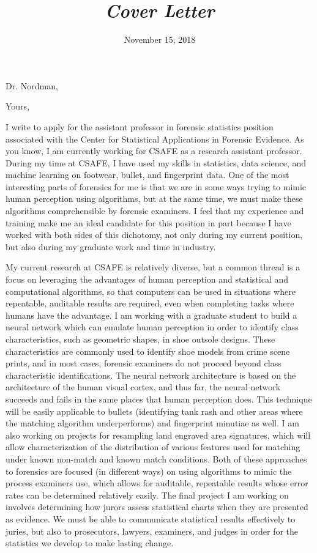 \documentclass[12pt, letterpaper, sans]{moderncv}
\title{\emph{Cover Letter}}
\begin{document}
\date{November 15, 2018}
\opening{Dr. Nordman,}
\closing{Yours,}
\makelettertitle

I write to apply for the assistant professor in forensic statistics position associated with the Center for Statistical Applications in Forensic Evidence. As you know, I am currently working for CSAFE as a research assistant professor. During my time at CSAFE, I have used my skills in statistics, data science, and machine learning on footwear, bullet, and fingerprint data. One of the most interesting parts of forensics for me is that we are in some ways trying to mimic human perception using algorithms, but at the same time, we must make these algorithms comprehensible by forensic examiners. I feel that my experience and training make me an ideal candidate for this position in part because I have worked with both sides of this dichotomy, not only during my current position, but also during my graduate work and time in industry. 

My current research at CSAFE is relatively diverse, but a common thread is a focus on leveraging the advantages of human perception and  statistical and computational algorithms, so that computers can be used in situations where repeatable, auditable results are required, even when completing tasks where humans have the advantage. I am working with a graduate student to build a neural network which can emulate human perception in order to identify class characteristics, such as geometric shapes, in shoe outsole designs. These characteristics are commonly used to identify shoe models from crime scene prints, and in most cases, forensic examiners do not proceed beyond class characteristic identifications. The neural network architecture is based on the architecture of the human visual cortex, and thus far, the neural network succeeds and fails in the same places that human perception does. This technique will be easily applicable to bullets (identifying tank rash and other areas where the matching algorithm underperforms) and fingerprint minutiae as well. I am also working on projects for resampling land engraved area signatures, which will allow characterization of the distribution of various features used for matching under known non-match and known match conditions. Both of these approaches to forensics are focused (in different ways) on using algorithms to mimic the process examiners use, which allows for auditable, repeatable results whose error rates can be determined relatively easily. The final project I am working on involves determining how jurors assess statistical charts when they are presented as evidence. We must be able to communicate statistical results effectively to juries, but also to prosecutors, lawyers, examiners, and judges in order for the statistics we develop to make lasting change. 
\end{document}
